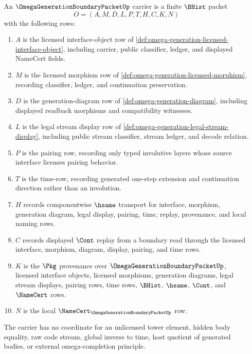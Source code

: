 \begin{definition}
\label{def:omega-generation-boundary-packet}
An $\OmegaGenerationBoundaryPacketUp$ carrier is a finite $\BHist$ packet
$$
O=(A,M,D,L,P,T,H,C,K,N)
$$
with the following rows:
\begin{enumerate}
\item $A$ is the licensed interface-object row of \autoref{def:omega-generation-licensed-interface-object}, including carrier, public classifier, ledger, and displayed NameCert fields.
\item $M$ is the licensed morphism row of \autoref{def:omega-generation-licensed-morphism}, recording classifier, ledger, and continuation preservation.
\item $D$ is the generation-diagram row of \autoref{def:omega-generation-diagram}, including displayed readback morphisms and compatibility witnesses.
\item $L$ is the legal stream display row of \autoref{def:omega-generation-legal-stream-display}, including public stream classifier, stream ledger, and decode relation.
\item $P$ is the pairing row, recording only typed involutive layers whose source interface licenses pairing behavior.
\item $T$ is the time-row, recording generated one-step extension and continuation direction rather than an involution.
\item $H$ records componentwise $\hsame$ transport for interface, morphism, generation diagram, legal display, pairing, time, replay, provenance, and local naming rows.
\item $C$ records displayed $\Cont$ replay from a boundary read through the licensed interface, morphism, diagram, display, pairing, and time rows.
\item $K$ is the $\Pkg$ provenance over $\OmegaGenerationBoundaryPacketUp$, licensed interface objects, licensed morphisms, generation diagrams, legal stream displays, pairing rows, time rows, $\BHist$, $\hsame$, $\Cont$, and $\NameCert$ rows.
\item $N$ is the local $\NameCert_{\OmegaGenerationBoundaryPacketUp}$ row.
\end{enumerate}
The carrier has no coordinate for an unlicensed tower element, hidden body equality, raw code stream, global inverse to time, host quotient of generated bodies, or external omega-completion principle.
\end{definition}


